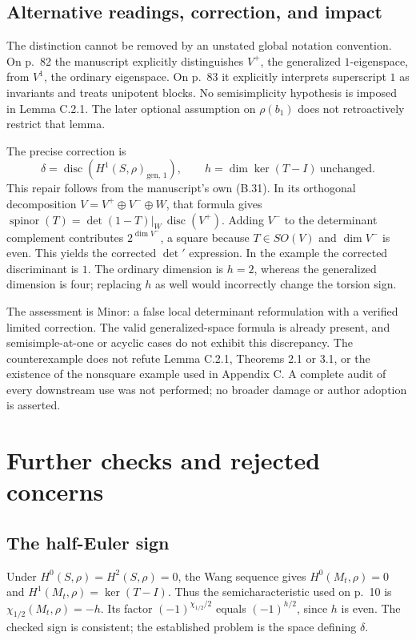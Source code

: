 \documentclass[10pt]{article}
\begin{document}
\subsection*{Alternative readings, correction, and impact}
The distinction cannot be removed by an unstated global notation convention. On p. 82 the manuscript explicitly distinguishes \(V^+\), the generalized \(1\)-eigenspace, from \(V^1\), the ordinary eigenspace. On p. 83 it explicitly interprets superscript \(1\) as invariants and treats unipotent blocks. No semisimplicity hypothesis is imposed in Lemma C.2.1. The later optional assumption on \(\rho(b_1)\) does not retroactively restrict that lemma.\par
The precise correction is \[\delta=\operatorname{disc}\!\left(H^1(S,\rho)_{\mathrm{gen},\,1}\right),
 \qquad h=\dim\ker(T-I)\ \text{unchanged}.\] This repair follows from the manuscript’s own (B.31). In its orthogonal decomposition \(V=V^+\oplus V^-\oplus W\), that formula gives \(\operatorname{spinor}(T)=\det(1-T)|_W\,\operatorname{disc}(V^+)\). Adding \(V^-\) to the determinant complement contributes \(2^{\dim V^-}\), a square because \(T\in SO(V)\) and \(\dim V^-\) is even. This yields the corrected \(\det{}'\) expression. In the example the corrected discriminant is \(1\). The ordinary dimension is \(h=2\), whereas the generalized dimension is four; replacing \(h\) as well would incorrectly change the torsion sign.\par
The assessment is Minor: a false local determinant reformulation with a verified limited correction. The valid generalized-space formula is already present, and semisimple-at-one or acyclic cases do not exhibit this discrepancy. The counterexample does not refute Lemma C.2.1, Theorems 2.1 or 3.1, or the existence of the nonsquare example used in Appendix C. A complete audit of every downstream use was not performed; no broader damage or author adoption is asserted.\par
\section*{Further checks and rejected concerns}
\subsection*{The half-Euler sign}
Under \(H^0(S,\rho)=H^2(S,\rho)=0\), the Wang sequence gives \(H^0(M_t,\rho)=0\) and \(H^1(M_t,\rho)=\ker(T-I)\). Thus the semicharacteristic used on p. 10 is \(\chi_{1/2}(M_t,\rho)=-h\). Its factor \((-1)^{\chi_{1/2}/2}\) equals \((-1)^{h/2}\), since \(h\) is even. The checked sign is consistent; the established problem is the space defining \(\delta\).\par
\end{document}
